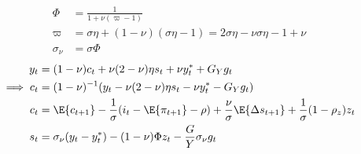 \begin{align}
    \Phi &= \frac{1}{1 + \nu (\varpi - 1)}\\
    \varpi &=  \sigma \eta + (1-\nu)(\sigma \eta - 1) = 2\sigma \eta-\nu\sigma \eta -1 + \nu\\
    \sigma_\nu &= \sigma \Phi
\end{align}
\pagebreak
\begin{align}
    y_t &= (1-\nu)c_t + \nu(2-\nu)\eta s_t + \nu y_t^* + G_Y g_t\\
    \implies c_t &= (1-\nu)^{-1}(y_t - \nu(2-\nu)\eta s_t - \nu y_t^* - G_Y g_t)\\
    c_t &= \E \{ c_{t+1}\} - \frac{1}{\sigma}(i_t - \E \{ \pi_{t+1}\} - \rho) + \frac{\nu}{\sigma}\E \{ \Delta s_{t+1} \} + \frac{1}{\sigma}(1-\rho_z)z_t \\
    s_t &= \sigma_\nu(y_t - y^*_t) - (1-\nu)\Phi z_t - \frac{G}{Y} \sigma_\nu g_t\\
\end{align}
